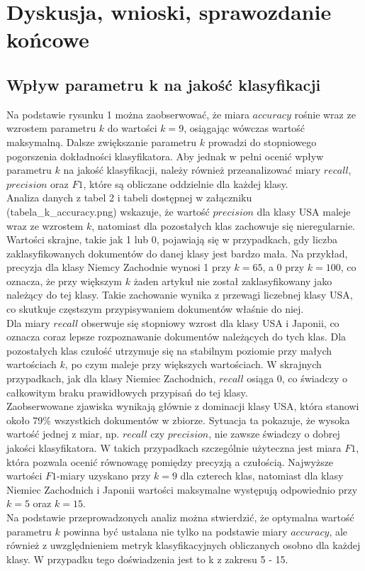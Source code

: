 \documentclass{article}
\begin{document}
\section{Dyskusja, wnioski, sprawozdanie końcowe}
\subsection{Wpływ parametru k na jakość klasyfikacji}
Na podstawie rysunku 1 można zaobserwować, że miara \(accuracy\) rośnie wraz ze wzrostem parametru \(k\) do wartości \(k = 9\), osiągając wówczas wartość maksymalną. Dalsze zwiększanie parametru \(k\) prowadzi do stopniowego pogorszenia dokładności klasyfikatora. Aby jednak w pełni ocenić wpływ parametru \(k\) na jakość klasyfikacji, należy również przeanalizować miary \(recall\), \(precision\) oraz \(F1\), które są obliczane oddzielnie dla każdej klasy. \\
Analiza danych z tabel 2 i tabeli dostępnej w załączniku (tabela\_k\_accuracy.png) wskazuje, że wartość \(precision\) dla klasy USA maleje wraz ze wzrostem \(k\), natomiast dla pozostałych klas zachowuje się nieregularnie. Wartości skrajne, takie jak 1 lub 0, pojawiają się w przypadkach, gdy liczba zaklasyfikowanych dokumentów do danej klasy jest bardzo mała. Na przykład, precyzja dla klasy Niemcy Zachodnie wynosi 1 przy \(k = 65\), a 0 przy \(k = 100\), co oznacza, że przy większym \(k\) żaden artykuł nie został zaklasyfikowany jako należący do tej klasy. Takie zachowanie wynika z przewagi liczebnej klasy USA, co skutkuje częstszym przypisywaniem dokumentów właśnie do niej. \\ 
Dla miary \(recall\) obserwuje się stopniowy wzrost dla klasy USA i Japonii, co oznacza coraz lepsze rozpoznawanie dokumentów należących do tych klas. Dla pozostałych klas czułość utrzymuje się na stabilnym poziomie przy małych wartościach \(k\), po czym maleje przy większych wartościach. W skrajnych przypadkach, jak dla klasy Niemiec Zachodnich, \(recall\) osiąga 0, co świadczy o całkowitym braku prawidłowych przypisań do tej klasy.\\
Zaobserwowane zjawiska wynikają głównie z dominacji klasy USA, która stanowi około 79\% wszystkich dokumentów w zbiorze. Sytuacja ta pokazuje, że wysoka wartość jednej z miar, np. \(recall\) czy \(precision\), nie zawsze świadczy o dobrej jakości klasyfikatora. W takich przypadkach szczególnie użyteczna jest miara \(F1\), która pozwala ocenić równowagę pomiędzy precyzją a czułością. Najwyższe wartości \(F1\)-miary uzyskano przy \(k = 9\) dla czterech klas, natomiast dla klasy Niemiec Zachodnich i Japonii wartości maksymalne występują odpowiednio przy \(k = 5\) oraz \(k = 15\). \\
Na podstawie przeprowadzonych analiz można stwierdzić, że optymalna wartość parametru \(k\) powinna być ustalana nie tylko na podstawie miary \(accuracy\), ale również z uwzględnieniem metryk klasyfikacyjnych obliczanych osobno dla każdej klasy. W przypadku tego doświadzenia jest to k z zakresu 5 - 15.
\end{document}
